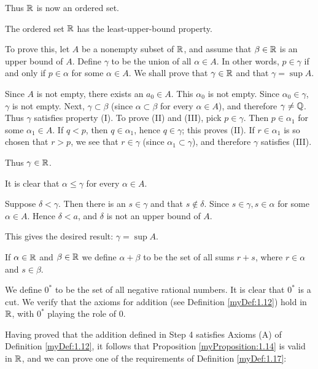 Thus ${\protect\mathbb R}$ is now an ordered set.


The ordered set ${\protect\mathbb R}$ has the least-upper-bound property.

To prove this, let $A$ be a nonempty subset of ${\protect\mathbb R}$, 
and assume that $\beta \in {\protect\mathbb R}$ is an upper bound of $A$. 
Define $\gamma$ to be the union of all $\alpha \in A$. 
In other words, $p \in \gamma$ if and only if $p \in \alpha$ for some $\alpha \in A$. 
We shall prove that $\gamma \in {\protect\mathbb R}$ and that $\gamma = \sup A$.

Since $A$ is not empty, there exists an $a_0 \in A$. 
This $\alpha_0$ is not empty. 
Since $\alpha_0 \in \gamma$, $\gamma$ is not empty. 
Next, $\gamma \subset \beta$ 
(since $\alpha \subset \beta$ for every $\alpha \in A$), 
and therefore $\gamma \neq {\protect\mathbb Q}$. 
Thus $\gamma$ satisfies property (I). 
To prove (II) and (III), pick $p \in \gamma$. 
Then $p \in \alpha_1$ for some $\alpha_1 \in A$. 
If $q <p$, then $q \in \alpha_1$, hence $q \in \gamma$; this proves (II). 
If $r \in \alpha_1$ is so chosen that $r > p$, 
we see that $r\in \gamma$ (since $\alpha_1 \subset \gamma$), 
and therefore $\gamma$ satisfies (III).

Thus $\gamma \in {\protect\mathbb R}$.

It is clear that $\alpha \leq \gamma$ for every $\alpha \in A$.

Suppose $\delta < \gamma$. 
Then there is an $s \in \gamma$ and that $s \not\in \delta$. 
Since $s \in \gamma, s \in \alpha$ for some $\alpha \in A$. 
Hence $\delta <a$, and $\delta$ is not an upper bound of $A$.

This gives the desired result: $\gamma = \sup A$.


If $\alpha \in {\protect\mathbb R}$ and $\beta \in {\protect\mathbb R}$ 
we define $\alpha + \beta$ to be the set of all sums $r + s$, 
where $r \in \alpha$ and $s \in \beta$.

We define $0^*$ to be the set of all negative rational numbers. 
It is clear that $0^*$ is a cut. 
We verify that the axioms for addition 
(see Definition \ref{myDef:1.12}) 
hold in ${\protect\mathbb R}$, with $0^*$ playing the role of $0$.

Having proved that the addition defined in Step 4 satisfies Axioms (A) of Definition \ref{myDef:1.12}, 
it follows that Proposition \ref{myProposition:1.14} is valid in ${\protect\mathbb R}$, and we can
prove one of the requirements of Definition \ref{myDef:1.17}:

